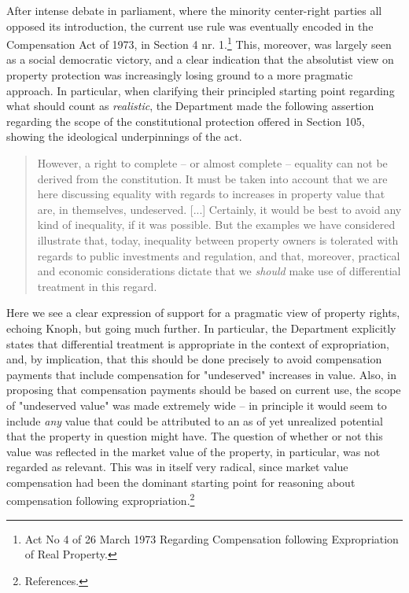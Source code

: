 After intense debate in parliament, where the minority center-right parties all opposed its introduction, the current use rule was eventually encoded in the Compensation Act of 1973, in Section 4 nr. 1.\footnote{Act No 4 of 26 March 1973 Regarding Compensation following Expropriation of Real Property.} This, moreover, was largely seen as a social democratic victory, and a clear indication that the absolutist view on property protection was increasingly losing ground to a more pragmatic approach. In particular, when clarifying their principled starting point regarding what should count as \emph{realistic}, the Department made the following assertion regarding the scope of the constitutional protection offered in Section 105, showing the ideological underpinnings of the act.

\begin{quote}
However, a right to complete -- or almost complete -- equality can not be derived from the constitution. It must be taken into account that we are here discussing equality with regards to increases in property value that are, in themselves, undeserved. [...]  %
Certainly, it would be best to avoid any kind of inequality, if it was possible. But the examples we have considered illustrate that, today, inequality between property owners is tolerated with regards to public investments and regulation, and that, moreover, practical and economic considerations dictate that we \emph{should} make use of differential treatment in this regard.
\end{quote}

Here we see a clear expression of support for a pragmatic view of property rights, echoing Knoph, but going much further. In particular, the Department explicitly states that differential treatment is appropriate in the context of expropriation, and, by implication, that this should be done precisely to avoid compensation payments that include compensation for "undeserved" increases in value. Also, in proposing that compensation payments should be based on current use, the scope of "undeserved value" was made extremely wide -- in principle it would seem to include \emph{any} value that could be attributed to an as of yet unrealized potential that the property in question might have. The question of whether or not this value was reflected in the market value of the property, in particular, was not regarded as relevant. This was in itself very radical, since market value compensation had been the dominant starting point for reasoning about compensation following expropriation.\footnote{References.}

